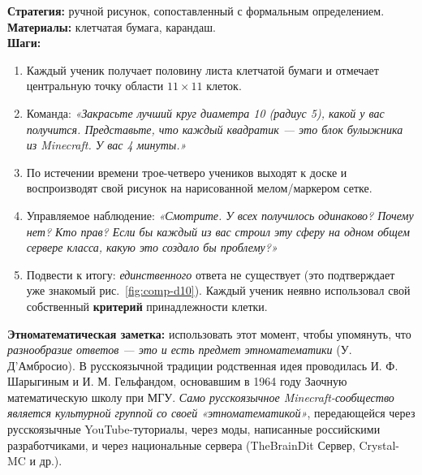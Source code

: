 \documentclass[12pt,a4paper]{scrartcl}
\newcommand{\acc}[1]{\textcolor{accent}{\textbf{#1}}}
\newcommand{\tempo}[1]{\textnormal{\footnotesize\color{bg!90!white}\textsf{#1}}}
\begin{document}
\begin{zadanie}[1.2 --- Проблематизация \quad\tempo{15 мин}]
\textbf{Стратегия:} ручной рисунок, сопоставленный с формальным определением. \\[0.4em]
\textbf{Материалы:} клетчатая бумага, карандаш. \\[0.4em]
\textbf{Шаги:}
\begin{enumerate}[leftmargin=1.5em,itemsep=0.2em,topsep=0.3em,nosep]
  \item Каждый ученик получает половину листа клетчатой бумаги и отмечает центральную точку области $11 \times 11$ клеток.
  \item Команда: \emph{«Закрасьте лучший круг диаметра 10 (радиус 5), какой у вас получится. \emph{Представьте, что каждый квадратик --- это блок булыжника из Minecraft.} У вас 4 минуты.»}
  \item По истечении времени трое-четверо учеников выходят к доске и воспроизводят свой рисунок на нарисованной мелом/маркером сетке.
  \item Управляемое наблюдение: \emph{«Смотрите. У всех получилось одинаково? Почему нет? Кто прав? Если бы каждый из вас строил эту сферу на одном общем сервере класса, какую это создало бы проблему?»}
  \item Подвести к итогу: \emph{единственного} ответа не существует (это подтверждает уже знакомый рис.~\ref{fig:comp-d10}). Каждый ученик неявно использовал свой собственный \acc{критерий} принадлежности клетки.
\end{enumerate}

\textbf{Этно\-мате\-ма\-ти\-чес\-кая заметка:} использовать этот момент, чтобы упомянуть, что \emph{разнообразие ответов --- это и есть предмет этноматематики} (У. Д'Амбросио). В русскоязычной традиции родственная идея проводилась И. Ф. Шарыгиным и И. М. Гельфандом, основавшим в 1964 году Заочную математическую школу при МГУ. \emph{Само русскоязычное Minecraft-сообщество является культурной группой со своей «этноматематикой»}, передающейся через русскоязычные YouTube-туториалы, через моды, написанные российскими разработчиками, и через национальные сервера (TheBrainDit Сервер, Crystal-MC и др.).
\end{zadanie}
\end{document}
